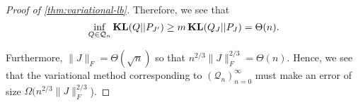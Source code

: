 \documentclass[final, 12pt]{colt2018}
\newcommand{\bE}{\mathbb{E}}
\newcommand{\E}{\bE}      %
\newcommand{\KL}{\mathop{\bf KL\/}}
\theoremstyle{definition}
\theoremstyle{plain}
\begin{document}
\begin{proof}[Proof of \cref{thm:variational-lb}]
Therefore, we see that  
$$ \inf_{Q\in \mathcal{Q}_n}\KL(Q|| P_{J'}) \geq m \KL (Q_J|| P_J) = \Theta(n).$$
\iffalse
entropy we see
\begin{align*} 
\KL(Q_{J'} || P_{J'}) 
&= \sum_{i = 1}^m \E_{Q_{J'}}[X_{V_i}^T J X_{V_i}] + H_{Q_{J'}}(X) \\
&\le \sum_{i = 1}^m (\E_{Q_{J'}}[X_{V_i}^T J X_{V_i}] + H_{Q_{J'}}(X_{V_i})).
\end{align*}
\fi
Furthermore, $\|J\|_F = \Theta(\sqrt{n})$ so that $n^{2/3} \|J\|_F^{2/3} = \Theta(n)$. Hence, we see that the variational method corresponding to $(\mathcal{Q}_n)_{n = 0}^{\infty}$ must make an error of size $\Omega(n^{2/3} \|J\|_F^{2/3}$).
\end{proof}
\end{document}
